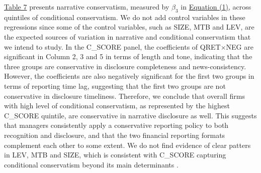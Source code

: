 \documentclass[letterpaper,11pt]{article}
\begin{document}
\begin{spacing}{1.5}
\hyperref[T7]{Table 7} presents narrative conservatism, measured by $\beta_3$ in \hyperref[eq1]{Equation (1)}, across quintiles of conditional conservatism. We do not add control variables in these regressions since some of the control variables, such as SIZE, MTB and LEV, are the expected sources of variation in narrative and conditional conservatism that we intend to study. In the C\_SCORE panel, the coefficients of QRET$\times$NEG are significant in Column 2, 3 and 5 in terms of length and tone, indicating that the three groups are conservative in disclosure completeness and news-consistency. However, the coefficients are also negatively significant for the first two groups in terms of reporting time lag, suggesting that the first two groups are not conservative in disclosure timeliness. Therefore, we conclude that overall firms with high level of conditional conservatism, as represented by the highest C\_SCORE quintile, are conservative in narrative disclosure as well. This suggests that managers consistently apply a conservative reporting policy to both recognition and disclosure, and that the two financial reporting formats complement each other to some extent. We do not find evidence of clear patters in LEV, MTB and SIZE, which is consistent with C\_SCORE capturing conditional conservatism beyond its main determinants \cite{khanEstimationEmpiricalProperties2009}.


\end{spacing}
\end{document}
